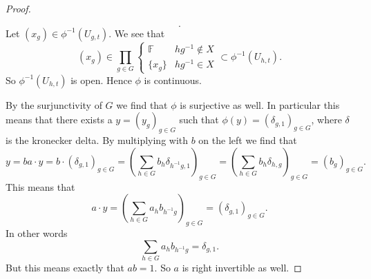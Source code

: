 \documentclass[titlepage, a4paper]{article}
\newcommand{\F}{\mathbb{F}}
\theoremstyle{remark}
\begin{document}
\begin{proof}
\begin{itemize}
\[			.\] 
			Let  $(x_g) \in \phi^{-1}(U_{g,t})$. We see that  \[
				(x_g) \in \prod_{g \in G} \begin{cases}
					\F & hg^{-1} \not\in X\\
					\{x_g\} & hg^{-1} \in X
				\end{cases}
				\subset \phi^{-1}(U_{h, t})
			.\] 
			So $\phi^{-1}(U_{h,t})$ is open. Hence $\phi$ is continuous.			
		\end{itemize}
		By the surjunctivity of $G$ we find that $\phi$ is surjective as well. In particular this means that there exists a $y = (y_g)_{g \in G}$ such that $\phi(y) = (\delta_{g, 1})_{g \in G}$, where $\delta$ is the kronecker delta.
		By multiplying with $b$ on the left we find that \[
			 y = ba\cdot y = b\cdot (\delta_{g, 1})_{g \in G} = \left( \sum_{h \in G} b_{h} \delta_{h^{-1}g, 1} \right)_{g \in G} = \left( \sum_{h \in G} b_{h} \delta_{h, g} \right)_{g \in G}
		 = \left( b_{g} \right) _{g \in G}.\] 
		This means that \[
		a\cdot y = \left( \sum_{h \in G} a_h b_{h^{-1}g} \right)_{g \in G} = \left( \delta_{g, 1} \right) _{g \in G} 
	.\] 
	In other words
	\[
	\sum_{h \in G} a_h b_{h^{-1}g} = \delta_{g, 1}
	.\]
	But this means exactly that $ab = 1$. So  $a$ is right invertible as well. 
	\end{proof}	
	
	
	\pagebreak
	\printbibliography
\end{document}
